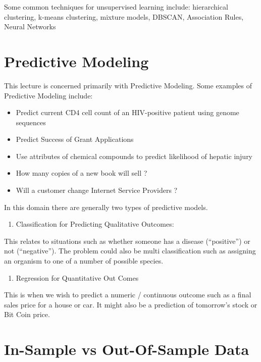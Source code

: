 \documentclass[]{book}
\providecommand{\tightlist}{%
  \setlength{\itemsep}{0pt}\setlength{\parskip}{0pt}}
\begin{document}
Some common techniques for unsupervised learning include: hierarchical
clustering, k-means clustering, mixture models, DBSCAN, Association
Rules, Neural Networks

\section{Predictive Modeling}\label{predictive-modeling}

This lecture is concerned primarily with Predictive Modeling. Some
examples of Predictive Modeling include:

\begin{itemize}
\item
  Predict current CD4 cell count of an HIV-positive patient using genome
  sequences
\item
  Predict Success of Grant Applications
\item
  Use attributes of chemical compounds to predict likelihood of hepatic
  injury
\item
  How many copies of a new book will sell ?
\item
  Will a customer change Internet Service Providers ?
\end{itemize}

In this domain there are generally two types of predictive models.

\begin{enumerate}
\def\labelenumi{\arabic{enumi})}
\tightlist
\item
  Classification for Predicting Qualitative Outcomes:
\end{enumerate}

This relates to situations such as whether someone has a disease
(``positive'') or not (``negative''). The problem could also be multi
classification such as assigning an organism to one of a number of
possible species.

\begin{enumerate}
\def\labelenumi{\arabic{enumi})}
\setcounter{enumi}{1}
\tightlist
\item
  Regression for Quantitative Out Comes
\end{enumerate}

This is when we wish to predict a numeric / continuous outcome such as a
final sales price for a house or car. It might also be a prediction of
tomorrow's stock or Bit Coin price.

\section{In-Sample vs Out-Of-Sample
Data}\label{in-sample-vs-out-of-sample-data}
\end{document}
